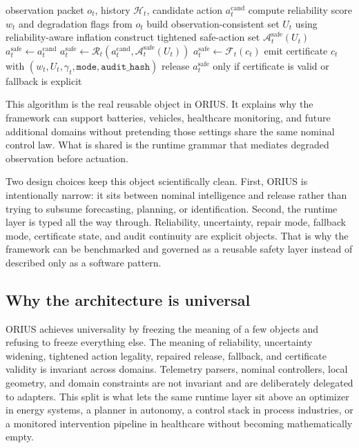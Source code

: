 \begin{algorithm}[t]
\caption{Detect--Calibrate--Constrain--Shield--Certify Runtime Step}
\label{alg:prof-runtime-step}
\begin{algorithmic}
\Require observation packet \(o_t\), history \(\mathcal{H}_t\), candidate action
\(a_t^{\mathrm{cand}}\)
\State compute reliability score \(w_t\) and degradation flags from \(o_t\)
\State build observation-consistent set \(U_t\) using reliability-aware inflation
\State construct tightened safe-action set \(\mathcal{A}^{\mathrm{safe}}_t(U_t)\)
  \State \(a_t^{\mathrm{safe}} \gets a_t^{\mathrm{cand}}\)
  \State \(a_t^{\mathrm{safe}} \gets \mathcal{R}_t(a_t^{\mathrm{cand}}, \mathcal{A}^{\mathrm{safe}}_t(U_t))\)
\Else
  \State \(a_t^{\mathrm{safe}} \gets \mathcal{F}_t(c_t)\)
\EndIf
\State emit certificate \(c_t\) with \((w_t,U_t,\gamma_t,\texttt{mode},\texttt{audit\_hash})\)
\State release \(a_t^{\mathrm{safe}}\) only if certificate is valid or fallback is explicit
\end{algorithmic}
\end{algorithm}

This algorithm is the real reusable object in ORIUS. It explains why the framework can
support batteries, vehicles, healthcare monitoring, and future additional domains
without pretending those settings share the same nominal control law. What is shared is
the runtime grammar that mediates degraded observation before actuation.

Two design choices keep this object scientifically clean. First, ORIUS is intentionally
narrow: it sits between nominal intelligence and release rather than trying to subsume
forecasting, planning, or identification. Second, the runtime layer is typed all the
way through. Reliability, uncertainty, repair mode, fallback mode, certificate state,
and audit continuity are explicit objects. That is why the framework can be benchmarked
and governed as a reusable safety layer instead of described only as a software pattern.

\subsection{Why the architecture is universal}
ORIUS achieves universality by freezing the meaning of a few objects and refusing to
freeze everything else. The meaning of reliability, uncertainty widening, tightened
action legality, repaired release, fallback, and certificate validity is invariant
across domains. Telemetry parsers, nominal controllers, local geometry, and domain
constraints are not invariant and are deliberately delegated to adapters. This split is
what lets the same runtime layer sit above an optimizer in energy systems, a planner in
autonomy, a control stack in process industries, or a monitored intervention pipeline
in healthcare without becoming mathematically empty.
